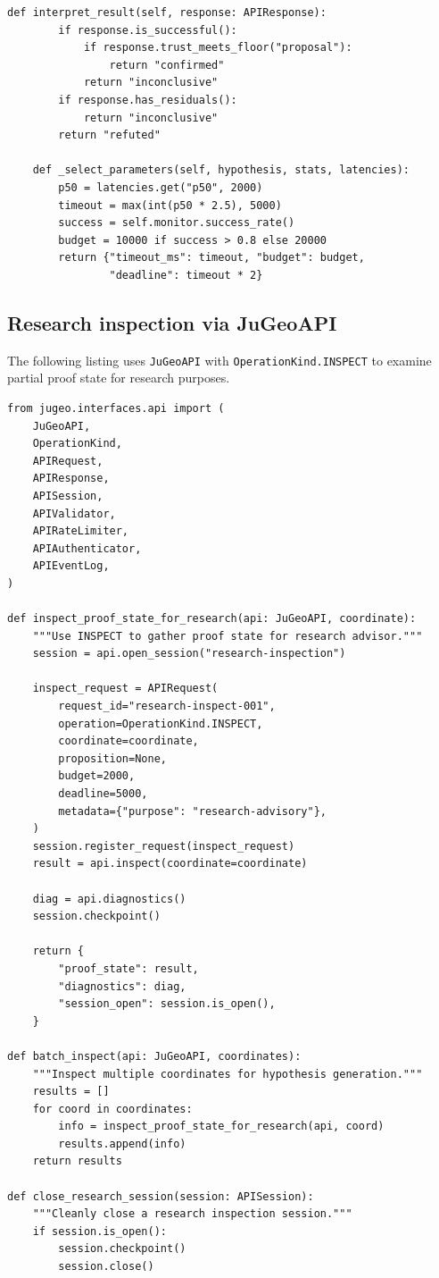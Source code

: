 \documentclass[11pt]{article}
\begin{document}
\begin{lstlisting}[style=jugeo-python,
  caption={Experiment planning with CopilotAPIBridge},
  label={lst:expplan}]
    def interpret_result(self, response: APIResponse):
        if response.is_successful():
            if response.trust_meets_floor("proposal"):
                return "confirmed"
            return "inconclusive"
        if response.has_residuals():
            return "inconclusive"
        return "refuted"

    def _select_parameters(self, hypothesis, stats, latencies):
        p50 = latencies.get("p50", 2000)
        timeout = max(int(p50 * 2.5), 5000)
        success = self.monitor.success_rate()
        budget = 10000 if success > 0.8 else 20000
        return {"timeout_ms": timeout, "budget": budget,
                "deadline": timeout * 2}
\end{lstlisting}

\subsection{Research inspection via JuGeoAPI}

The following listing uses \texttt{JuGeoAPI} with
\texttt{OperationKind.INSPECT} to examine partial
proof state for research purposes.

\begin{lstlisting}[style=jugeo-python,
  caption={Research inspection with JuGeoAPI},
  label={lst:inspect}]
from jugeo.interfaces.api import (
    JuGeoAPI,
    OperationKind,
    APIRequest,
    APIResponse,
    APISession,
    APIValidator,
    APIRateLimiter,
    APIAuthenticator,
    APIEventLog,
)

def inspect_proof_state_for_research(api: JuGeoAPI, coordinate):
    """Use INSPECT to gather proof state for research advisor."""
    session = api.open_session("research-inspection")

    inspect_request = APIRequest(
        request_id="research-inspect-001",
        operation=OperationKind.INSPECT,
        coordinate=coordinate,
        proposition=None,
        budget=2000,
        deadline=5000,
        metadata={"purpose": "research-advisory"},
    )
    session.register_request(inspect_request)
    result = api.inspect(coordinate=coordinate)

    diag = api.diagnostics()
    session.checkpoint()

    return {
        "proof_state": result,
        "diagnostics": diag,
        "session_open": session.is_open(),
    }

def batch_inspect(api: JuGeoAPI, coordinates):
    """Inspect multiple coordinates for hypothesis generation."""
    results = []
    for coord in coordinates:
        info = inspect_proof_state_for_research(api, coord)
        results.append(info)
    return results

def close_research_session(session: APISession):
    """Cleanly close a research inspection session."""
    if session.is_open():
        session.checkpoint()
        session.close()
\end{lstlisting}
\end{document}
